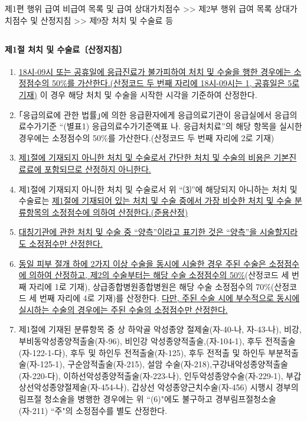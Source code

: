 \begin{mdframed}[linecolor=blue,middlelinewidth=2]  
제1편 행위 급여 \cntrdot{}  비급여 목록 및 급여 상대가치점수 >> 제2부 행위 급여 목록\cntrdot{} 상대가치점수 및 산정지침 >> 제9장 처치 및 수술료 등 
\end{mdframed}
\subsection{}
\paragraph{제1절 처치 및 수술료〔산정지침〕}
\begin{enumerate}[(1)]\tightlist
\item \uline{18시-09시 또는 공휴일에 응급진료가 불가피하여 처치 및 수술을 행한 경우에는 소정점수의 50\%를 가산한다.(산정코드 두 번째 자리에 18시-09시는 1, 공휴일은 5로 기재)} 이 경우 해당 처치 및 수술을 시작한 시각을 기준하여 산정한다.
\item ｢응급의료에 관한 법률｣에 의한 응급환자에게 응급의료기관이 응급실에서 응급의료수가기준 “(별표1) 응급의료수가기준액표 나. 응급처치료”의 해당 항목을 실시한 경우에는 소정점수의 50\%를 가산한다.(산정코드 두 번째 자리에 2로 기재)
\item \uline{제1절에 기재되지 아니한 처치 및 수술로서 간단한 처치 및 수술의 비용은 기본진료료에 포함되므로 산정하지 아니한다.}
\item 제1절에 기재되지 아니한 처치 및 수술로서 위 “⑶”에 해당되지 아니하는 처치 및 수술료는 \uline{제1절에 기재되어 있는 처치 및 수술 중에서 가장 비슷한 처치 및 수술 분류항목의 소정점수에 의하여 산정한다.(준용산정)}
\item \uline{대칭기관에 관한 처치 및 수술 중 “양측”이라고 표기한 것은 “양측”을 시술할지라도 소정점수만 산정한다.}
\item \uline{동일 피부 절개 하에 2가지 이상 수술을 동시에 시술한 경우 주된 수술은 소정점수에 의하여 산정하고, 제2의 수술부터는 해당 수술 소정점수의 50\%}(산정코드 세 번째 자리에 1로 기재), 상급종합병원\cntrdot{}종합병원은 해당 수술 소정점수의 70\%(산정코드 세 번째 자리에 4로 기재)를 산정한다. \uline{다만, 주된 수술 시에 부수적으로 동시에 실시하는 수술의 경우에는 주된 수술의 소정점수만 산정한다.}
\item 제1절에 기재된 분류항목 중 상\cntrdot{} 하악골 악성종양 절제술(자-40-나,
자-43-나), 비강, 부비동악성종양적출술(자-96), 비인강 악성종양적출술,(자-104-1), 후두 전적출술(자-122-1-다), 후두 및 하인두 전적출술(자-125), 후두 전적출 및 하인두 부분적출술(자-125-1), 구순암적출술(자-215), 설암 수술(자-218),구강내악성종양적출술(자-220-다), 이하선악성종양적출술(자-223-나), 인두악성종양수술(자-229-1), 부갑상선악성종양절제술(자-454-나), 갑상선 악성종양근치수술(자-456) 시행시 경부의 림프절 청소술을 병행한 경우에는 위 “(6)"에도 불구하고 경부림프절청소술(자-211) “주"의 소정점수를 별도 산정한다.

\end{enumerate}
